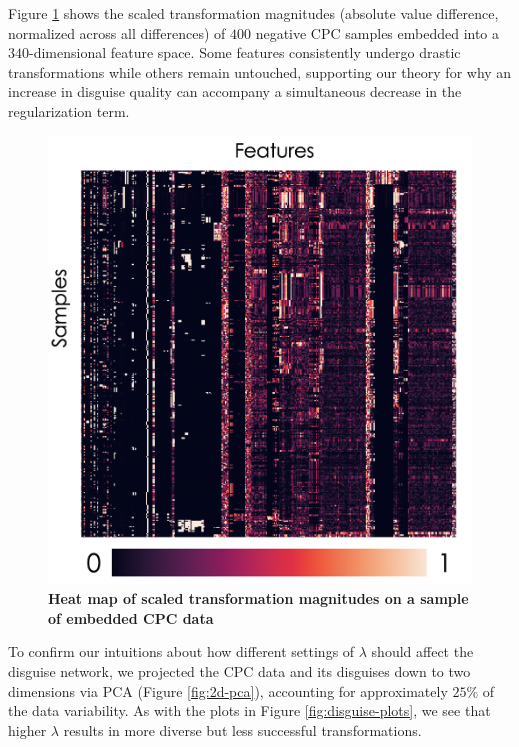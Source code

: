 \documentclass{proc}
\begin{document}
Figure \ref{fig:heatmap} shows the scaled transformation magnitudes (absolute value difference, normalized across all differences) of $400$ negative CPC samples embedded into a $340$-dimensional feature space. Some features consistently undergo drastic transformations while others remain untouched, supporting our theory for why an increase in disguise quality can accompany a simultaneous decrease in the regularization term.

\begin{figure}[h!]
		\includegraphics*[scale=0.33]{../figures/heatmap.png}
		\caption{\textbf{Heat map of scaled transformation magnitudes on a sample of embedded CPC data}}
		\label{fig:heatmap}
\end{figure}

To confirm our intuitions about how different settings of $\lambda$ should affect the disguise network, we projected the CPC data and its disguises down to two dimensions via PCA (Figure \ref{fig:2d-pca}), accounting for approximately $25\%$ of the data variability. As with the plots in Figure \ref{fig:disguise-plots}, we see that higher $\lambda$ results in more diverse but less successful transformations.
\end{document}
